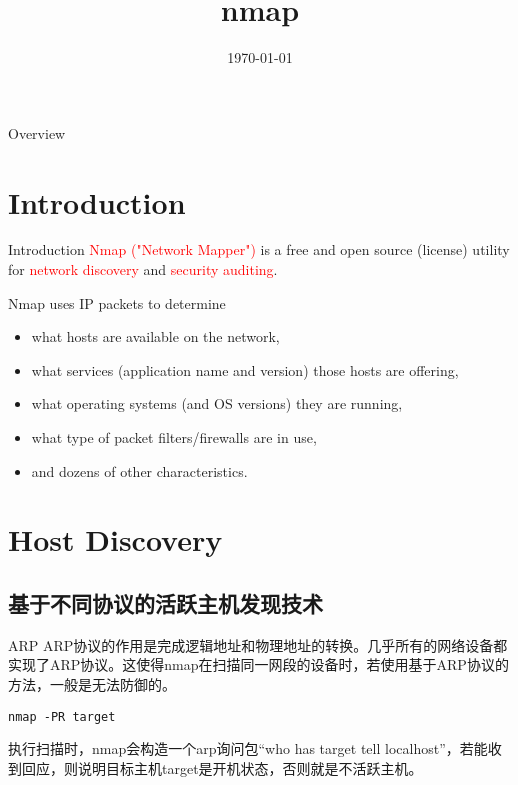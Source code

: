 \documentclass{beamer}
\title[nmap]{nmap} %
\author{} %
\institute[计算机科学与技术学院] %
{
贵州大学 \\ %
\medskip
\textit{hnzhang1@gzu.edu.cn} %
}
\date{\today} %
\begin{document}
\begin{frame}
\titlepage %
\end{frame}
\begin{frame}{Overview}
\tableofcontents
\end{frame}
\section{Introduction}
\begin{frame}{Introduction}
\textcolor{red}{Nmap ("Network Mapper")} is a free and open source (license) utility for \textcolor{red}{network discovery} and \textcolor{red}{security auditing}. 
 
 
 Nmap uses IP packets to determine 
 \begin{itemize}
 \item what hosts are available on the network, 
 \item what services (application name and version) those hosts are offering, 
 \item what operating systems (and OS versions) they are running, 
 \item what type of packet filters/firewalls are in use, 
 \item and dozens of other characteristics. 
 \end{itemize}
\end{frame}
\section{Host Discovery}
\begin{frame}
\end{frame}
\subsection{基于不同协议的活跃主机发现技术}
\begin{frame}
\end{frame}
\begin{frame}[fragile]{ARP}
ARP协议的作用是完成逻辑地址和物理地址的转换。几乎所有的网络设备都实现了ARP协议。这使得nmap在扫描同一网段的设备时，若使用基于ARP协议的方法，一般是无法防御的。
\begin{example}[命令语法]
\begin{verbatim}
nmap -PR target
\end{verbatim}
\end{example}
执行扫描时，nmap会构造一个arp询问包“who has target tell localhost”，若能收到回应，则说明目标主机target是开机状态，否则就是不活跃主机。
\end{frame}
\end{document}
